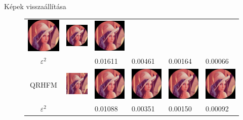 \documentclass{beamer}
\begin{document}
\begin{frame}{Képek visszaállítása}
\begin{adjustwidth}{-1.5em}{0em}
\begin{footnotesize}
\begin{figure}
\begin{tabular}{c | q q q q q }
    \includegraphics[width=50pt]{figures/reconstruction/ln256150.png} &
    \includegraphics[width=50pt]{figures/reconstruction/ln256250.png} &
    \includegraphics[width=50pt]{figures/reconstruction/ln256350.png} \\
    $\varepsilon^2$ & & 0.01611 & 0.00461 & 0.00164 & 0.00066  \\   
    QRHFM &
    \includegraphics[width=50pt]{figures/reconstruction/lo256.png} &
    \includegraphics[width=50pt]{figures/reconstruction/lf25650.png} &
    \includegraphics[width=50pt]{figures/reconstruction/lf256150.png} &
    \includegraphics[width=50pt]{figures/reconstruction/lf256250.png} &
    \includegraphics[width=50pt]{figures/reconstruction/lf256350.png} \\
    $\varepsilon^2$ & & 0.01088 & 0.00351 & 0.00150 & 0.00092  \\ 
    \end{tabular}

    \end{figure}
    \end{footnotesize}
    \end{adjustwidth}
\end{frame}
\end{document}
